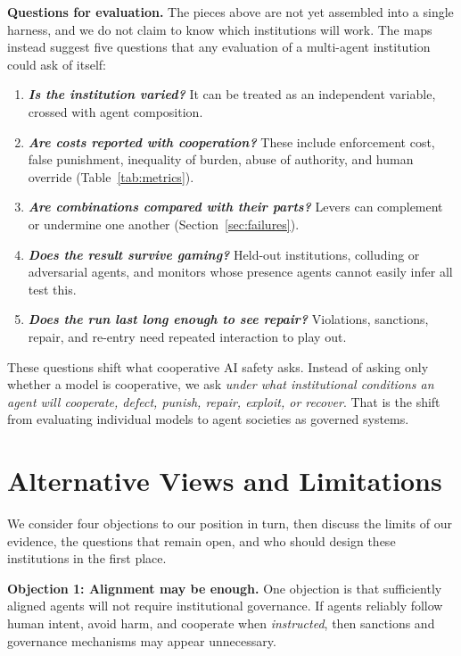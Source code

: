 \documentclass[runningheads]{llncs}
\begin{document}
\textbf{Questions for evaluation.} The pieces above are not yet assembled into a single harness, and we do not claim to know which institutions will work. The maps instead suggest five questions that any evaluation of a multi-agent institution could ask of itself:
\begin{enumerate}[noitemsep,topsep=1pt,parsep=1pt,partopsep=0pt]
    \item \textbf{\textit{Is the institution varied?}} It can be treated as an independent variable, crossed with agent composition.
    \item \textbf{\textit{Are costs reported with cooperation?}} These include enforcement cost, false punishment, inequality of burden, abuse of authority, and human override (Table~\mbox{\ref{tab:metrics}}).
    \item \textbf{\textit{Are combinations compared with their parts?}} Levers can complement or undermine one another (Section~\mbox{\ref{sec:failures}}).
    \item \textbf{\textit{Does the result survive gaming?}} Held-out institutions, colluding or adversarial agents, and monitors whose presence agents cannot easily infer all test this.
    \item \textbf{\textit{Does the run last long enough to see repair?}} Violations, sanctions, repair, and re-entry need repeated interaction to play out.
\end{enumerate}

These questions shift what cooperative AI safety asks. Instead of asking only whether a model is cooperative, we ask \emph{under what institutional conditions an agent will cooperate, defect, punish, repair, exploit, or recover}. That is the shift from evaluating individual models to agent societies as governed systems.

\section{Alternative Views and Limitations}\label{sec:discussion}

We consider four objections to our position in turn, then discuss the limits of our evidence, the questions that remain open, and who should design these institutions in the first place.

\textbf{Objection 1: Alignment may be enough.} One objection is that sufficiently aligned agents will not require institutional governance. If agents reliably follow human intent, avoid harm, and cooperate when \emph{instructed}, then sanctions and governance mechanisms may appear unnecessary.
\end{document}
